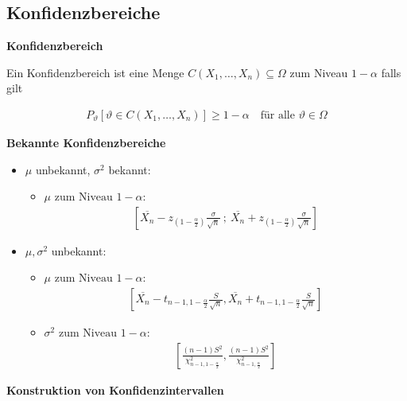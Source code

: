 \documentclass[25pt]{sciposter}
\newenvironment{method}[1]{\begin{mdframed}[backgroundcolor=blue!10,innertopmargin=15pt, innerbottommargin=15pt,nobreak=true]
		\textbf{#1 }
	}
	{ 
	\end{mdframed}
}
\newenvironment{thm}[1]{\begin{mdframed}[backgroundcolor=pink!20,innertopmargin=15pt, innerbottommargin=15pt, nobreak=true]
		\textbf{#1 }
	}
	{ 
	\end{mdframed}
}
\begin{document}
\begin{multicols}{3}
		
		\section{Konfidenzbereiche}
		
		\begin{method}{Konfidenzbereich}
			Ein Konfidenzbereich ist eine Menge $C(X_1,\ldots,X_n) \subseteq \Omega$ zum Niveau $1-\alpha$ falls gilt
			
			\begin{align*}
				P_{\vartheta} \left[\vartheta \in C(X_1,\ldots,X_n) \right] \geq 1 - \alpha \quad \text{für alle } \vartheta \in \Omega
			\end{align*}
		\end{method}
		
		
		\begin{thm}{Bekannte Konfidenzbereiche}
			\begin{itemize}
				\item 	$\mu$ unbekannt, $\sigma^2$ bekannt:
				\begin{itemize}
					\item $\mu \text{ zum Niveau } 1-\alpha$:
					\begin{align*}
						{\displaystyle \left[{{\overline{X_n}}-z_{(1-{\tfrac {\alpha }{2}})}{\frac {\sigma }{\sqrt {n}}}\ ;\ {\overline{X_n}}+z_{(1-{\tfrac {\alpha }{2}})}{\frac {\sigma }{\sqrt {n}}}}\right]}
					\end{align*}
				\end{itemize}
				\item 	$\mu, \sigma^2$ unbekannt:
				\begin{itemize}
					\item $\mu \text{ zum Niveau } 1-\alpha$:
					\begin{align*}
						\left[ \overline{X_n} -t_{n-1,1-\frac{\alpha}{2}}\frac{S}{\sqrt{n}} , \overline{X_n} +t_{n-1,1-\frac{\alpha}{2}}\frac{S}{\sqrt{n}}   \right]
					\end{align*}
					\item $\sigma^2 \text{ zum Niveau } 1-\alpha$:
					\begin{align*}
						\left[ \frac{(n-1)S^2}{\chi_{n-1,1-\frac{\alpha}{2}}^2} , \frac{(n-1)S^2}{\chi_{n-1,\frac{\alpha}{2}}^2}\right]
					\end{align*}
				\end{itemize}
			\end{itemize}
		\end{thm}
		
		\textbf{Konstruktion von Konfidenzintervallen}
		

\end{multicols}
\end{document}
